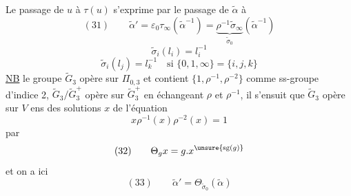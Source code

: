 Le passage de $u$ à $\tau(u)$ s'exprime par
le passage de $\widetilde\alpha$ à
\[
(31)\qquad\widetilde\alpha'=\varepsilon_0\tau_\infty(\widetilde\alpha^{-1})
=\underbrace{\rho^{-1}\widetilde\sigma_\infty}_{\widetilde\sigma_0}(\widetilde\alpha^{-1})
\]
\[
\widetilde\sigma_i(l_i)=l_i^{-1}
\]
\[
\widetilde\sigma_i(l_j)=l_k^{-1}\quad\text{si }\{0,1,\infty\}=\{i,j,k\}
\]
\uline{NB} le groupe $\widetilde G_3$ opère sur $\Pi_{0,3}$ et contient \deleted{$\unsure{\xi}$}  $\{1,\rho^{-1},\rho^{-2}\}$ comme ss-groupe  d'indice 2,  $\widetilde G_3/\widetilde G_3^+$ opère sur $\widetilde G_3^+$ en échangeant $\rho$ et $\rho^{-1}$, il s'ensuit que $\widetilde G_3$ opère sur $V$ ens des solutions $x$ de l'équation
\[
x\rho^{-1}(x)\rho^{-2}(x)=1
\]
par
\[
(32)\qquad\Theta_g x=g.x^{\unsure{\operatorname{sg}(g)}}
\]
et on a ici
\[
(33)\qquad\widetilde\alpha'=\Theta_{\widetilde\sigma_0}(\widetilde\alpha)
\]


